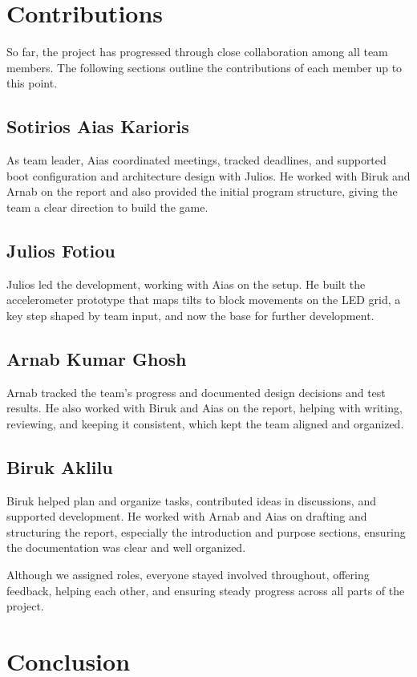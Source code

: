 \documentclass[12pt]{report}
\begin{document}
\chapter{Contributions}
So far, the project has progressed through close collaboration among all team members. The following sections outline the contributions of each member up to this point.

\section{Sotirios Aias Karioris}
As team leader, Aias coordinated meetings, tracked deadlines, and supported boot configuration and architecture design with Julios. He worked with Biruk and Arnab on the report and also provided the initial program structure, giving the team a clear direction to build the game.

\section{Julios Fotiou}
Julios led the development, working with Aias on the setup. He built the accelerometer prototype that maps tilts to block movements on the LED grid, a key step shaped by team input, and now the base for further development.

\section{Arnab Kumar Ghosh}
Arnab tracked the team’s progress and documented design decisions and test results. He also worked with Biruk and Aias on the report, helping with writing, reviewing, and keeping it consistent, which kept the team aligned and organized. 


\section{Biruk Aklilu}
Biruk helped plan and organize tasks, contributed ideas in discussions, and supported development. He worked with Arnab and Aias on drafting and structuring the report, especially the introduction and purpose sections, ensuring the documentation was clear and well organized.

 \vspace{3ex}Although we assigned roles, everyone stayed involved throughout, offering feedback, helping each other, and ensuring steady progress across all parts of the project. 

\chapter{Conclusion}
\end{document}
